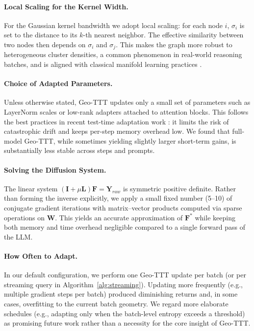 \documentclass{article}
\theoremstyle{plain}
\theoremstyle{definition}
\theoremstyle{remark}
\newcommand{\W}{\mathbf{W}}        %
\newcommand{\Lap}{\mathbf{L}}      %
\newcommand{\F}{\mathbf{F}}        %
\newcommand{\Y}{\mathbf{Y}}        %
\begin{document}
\paragraph{Local Scaling for the Kernel Width.}
For the Gaussian kernel bandwidth we adopt local scaling: for each node $i$, $\sigma_i$ is set to the distance to its $k$-th nearest neighbor. The effective similarity between two nodes then depends on $\sigma_i$ and $\sigma_j$. This makes the graph more robust to heterogeneous cluster densities, a common phenomenon in real-world reasoning batches, and is aligned with classical manifold learning practices \cite{belkin2003laplacian, coifman2005diffusion}.

\paragraph{Choice of Adapted Parameters.}
Unless otherwise stated, Geo-TTT updates only a small set of parameters such as LayerNorm scales or low-rank adapters attached to attention blocks. This follows the best practices in recent test-time adaptation work \cite{sun2023learning, tlm2025}: it limits the risk of catastrophic drift and keeps per-step memory overhead low. We found that full-model Geo-TTT, while sometimes yielding slightly larger short-term gains, is substantially less stable across steps and prompts.

\paragraph{Solving the Diffusion System.}
The linear system $(\mathbf{I} + \mu \Lap)\F = \Y_{raw}$ is symmetric positive definite. Rather than forming the inverse explicitly, we apply a small fixed number (5--10) of conjugate gradient iterations with matrix--vector products computed via sparse operations on $\W$. This yields an accurate approximation of $\F^*$ while keeping both memory and time overhead negligible compared to a single forward pass of the LLM.

\paragraph{How Often to Adapt.}
In our default configuration, we perform one Geo-TTT update per batch (or per streaming query in Algorithm~\ref{alg:streaming}). Updating more frequently (e.g., multiple gradient steps per batch) produced diminishing returns and, in some cases, overfitting to the current batch geometry. We regard more elaborate schedules (e.g., adapting only when the batch-level entropy exceeds a threshold) as promising future work rather than a necessity for the core insight of Geo-TTT.
\end{document}
